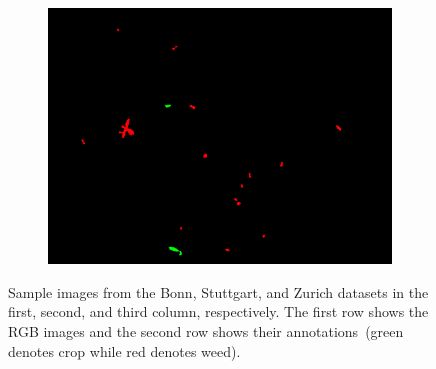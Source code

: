 \documentclass[letterpaper, 10 pt, conference]{ieeeconf}  %
\begin{document}
\begin{figure}
\begin{subfigure}[b]{0.31\linewidth}
    \includegraphics[width=\linewidth]{pics/zurich/annotations/bonirob_2016-10-13-09-03-00_0_frame66.png}
   		\caption{}
		\label{zurich_lbl}    		
   \end{subfigure}
    \caption{Sample images from the Bonn, Stuttgart, and Zurich datasets in the first, second, and third column, respectively. The first row shows the RGB images and the second row shows their annotations~(green denotes crop while red denotes weed).}
    \label{fig:datasets_images}
\end{figure}
\end{document}

